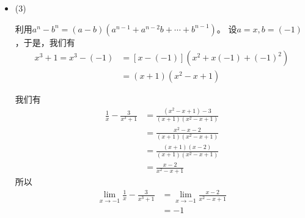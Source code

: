 \documentclass{article}
\begin{document}
\begin{itemize}
  \item (3)

        利用$a^n - b^n = (a - b)(a^{n-1} + a^{n-2}b + \cdots + b^{n-1})$。
        设$a = x, b = (-1)$，于是，我们有
        \begin{align*}
          x^3 + 1 = x^3 - (-1)
           & = [x - (-1)](x^2 + x(-1) + (-1)^2) \\
           & = (x + 1)(x^2 - x + 1)
        \end{align*}

        我们有
        \begin{align*}
          \frac{1}{x} - \frac{3}{x^3 + 1}
           & = \frac{(x^2 - x + 1) - 3}{(x+1)(x^2 - x + 1)} \\
           & = \frac{x^2 - x - 2}{(x+1)(x^2 - x + 1)}       \\
           & = \frac{(x+1)(x - 2)}{(x+1)(x^2 - x + 1)}      \\
           & = \frac{x - 2}{x^2 - x + 1}
        \end{align*}
        所以
        \begin{align*}
          \lim\limits_{x \to -1} \frac{1}{x} - \frac{3}{x^3 + 1}
           & = \lim\limits_{x \to -1} \frac{x - 2}{x^2 - x + 1} \\
           & = -1
        \end{align*}
\end{itemize}
\end{document}
